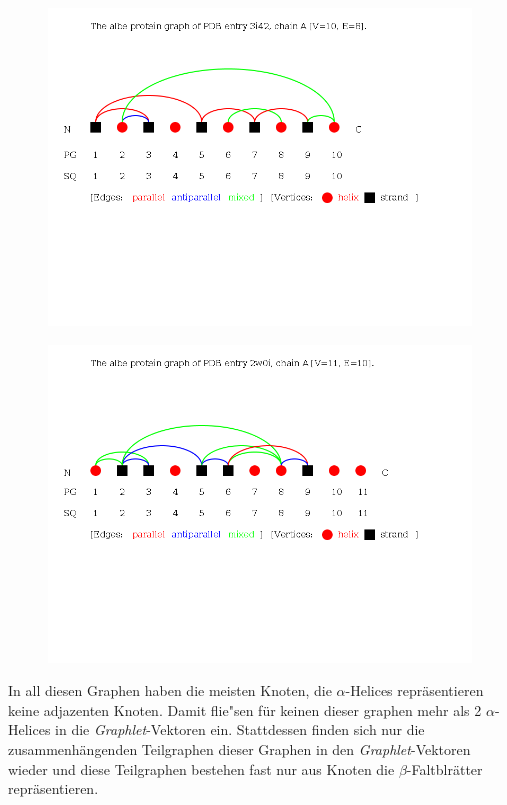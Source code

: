 \documentclass{report}
\begin{document}
\begin{figure}
\includegraphics[scale=0.5]{3i42_A_albe_PG.png}
\end{figure}

\begin{figure}
\includegraphics[scale=0.5]{2w0i_A_albe_PG.png}
\end{figure}

In all diesen Graphen haben die meisten Knoten, die $\alpha$-Helices repr\"asentieren keine adjazenten Knoten.
Damit flie"sen f\"ur keinen dieser graphen mehr als 2 $\alpha$-Helices in die \textit{Graphlet}-Vektoren ein. Stattdessen finden sich nur die zusammenh\"angenden Teilgraphen dieser Graphen in den \textit{Graphlet}-Vektoren wieder und diese Teilgraphen bestehen fast nur aus Knoten die $\beta$-Faltblr\"atter repr\"asentieren.
\end{document}
